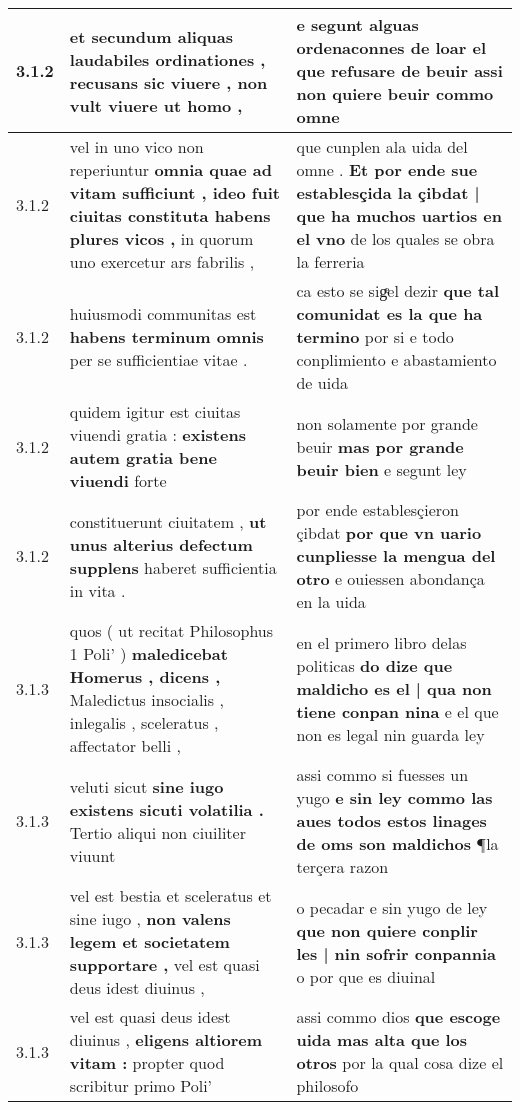 \begin{tabular}{|p{1cm}|p{6.5cm}|p{6.5cm}|}
3.1.2 & et secundum aliquas laudabiles ordinationes , \textbf{ recusans sic viuere , } non vult viuere ut homo , & e segunt alguas ordenaconnes de loar \textbf{ el que refusare de beuir } assi non quiere beuir commo omne \\\hline
3.1.2 & vel in uno vico non reperiuntur \textbf{ omnia quae ad vitam sufficiunt , ideo fuit ciuitas constituta habens plures vicos , } in quorum uno exercetur ars fabrilis , & que cunplen ala uida del omne . \textbf{ Et por ende sue establesçida la çibdat | que ha muchos uartios en el vno } de los quales se obra la ferreria \\\hline
3.1.2 & huiusmodi communitas est \textbf{ habens terminum omnis } per se sufficientiae vitae . & ca esto se sigͤel dezir \textbf{ que tal comunidat es la que ha termino } por si e todo conplimiento e abastamiento de uida \\\hline
3.1.2 & quidem igitur est ciuitas viuendi gratia : \textbf{ existens autem gratia bene viuendi } forte & non solamente por grande beuir \textbf{ mas por grande beuir bien } e segunt ley \\\hline
3.1.2 & constituerunt ciuitatem , \textbf{ ut unus alterius defectum supplens } haberet sufficientia in vita . & por ende establesçieron çibdat \textbf{ por que vn uario cunpliesse la mengua del otro } e ouiessen abondança en la uida \\\hline
3.1.3 & quos ( ut recitat Philosophus 1 Poli’ ) \textbf{ maledicebat Homerus , dicens , } Maledictus insocialis , inlegalis , sceleratus , affectator belli , & en el primero libro delas politicas \textbf{ do dize que maldicho es el | qua non tiene conpan nina } e el que non es legal nin guarda ley \\\hline
3.1.3 & veluti sicut \textbf{ sine iugo existens sicuti volatilia . } Tertio aliqui non ciuiliter viuunt & assi commo si fuesses un yugo \textbf{ e sin ley commo las aues todos estos linages de oms son maldichos } ¶la terçera razon \\\hline
3.1.3 & vel est bestia et sceleratus et sine iugo , \textbf{ non valens legem et societatem supportare , } vel est quasi deus idest diuinus , & o pecadar e sin yugo de ley \textbf{ que non quiere conplir les | nin sofrir conpannia } o por que es diuinal \\\hline
3.1.3 & vel est quasi deus idest diuinus , \textbf{ eligens altiorem vitam : } propter quod scribitur primo Poli’ & assi commo dios \textbf{ que escoge uida mas alta que los otros } por la qual cosa dize el philosofo \\\hline

\end{tabular}
